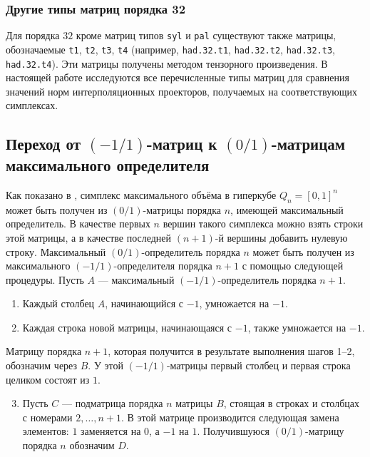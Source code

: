 \documentclass[main]{subfiles}
\begin{document}
\subsubsection{Другие типы матриц порядка 32}

Для порядка $32$ кроме матриц типов \texttt{syl} и \texttt{pal} существуют также матрицы, обозначаемые \texttt{t1}, \texttt{t2}, \texttt{t3}, \texttt{t4} (например, \texttt{had.32.t1}, \texttt{had.32.t2}, \texttt{had.32.t3}, \texttt{had.32.t4}). Эти матрицы получены методом тензорного произведения. В настоящей работе исследуются все перечисленные типы матриц для сравнения значений норм интерполяционных проекторов, получаемых на соответствующих симплексах.

\subsection{Переход от $(-1/1)$-матриц к $(0/1)$-матрицам максимального определителя}

Как показано в \cite{nevsky_geo}, симплекс максимального объёма в гиперкубе $Q_n = [0,1]^n$ может быть получен из $(0/1)$-матрицы порядка $n$, имеющей максимальный определитель. В качестве первых $n$ вершин такого симплекса можно взять строки этой матрицы, а в качестве последней $(n+1)$-й вершины добавить нулевую строку.
Максимальный $(0/1)$-определитель порядка $n$ может быть получен из максимального $(-1/1)$-определителя порядка $n+1$ с помощью следующей процедуры. Пусть $A$ — максимальный $(-1/1)$-определитель порядка $n+1$.

\begin{enumerate}
    \item Каждый столбец $A$, начинающийся с $-1$, умножается на $-1$.
    \item Каждая строка новой матрицы, начинающаяся с $-1$, также умножается на $-1$.
\end{enumerate}

Матрицу порядка $n+1$, которая получится в результате выполнения шагов 1–2, обозначим через $B$. У этой $(-1/1)$-матрицы первый столбец и первая строка целиком состоят из $1$.

\begin{enumerate}
    \setcounter{enumi}{2}
    \item Пусть $C$ — подматрица порядка $n$ матрицы $B$, стоящая в строках и столбцах с номерами $2, \dots, n+1$. В этой матрице производится следующая замена элементов: $1$ заменяется на $0$, а $-1$ на $1$. Получившуюся $(0/1)$-матрицу порядка $n$ обозначим $D$.
\end{enumerate}
\end{document}
